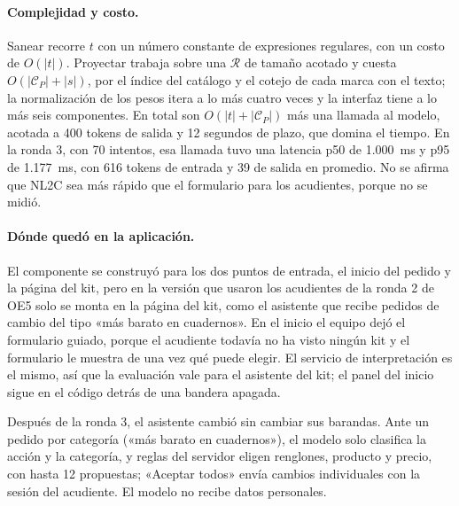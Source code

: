 \paragraph{Complejidad y costo.} Sanear recorre $t$ con un número constante de expresiones
regulares, con un costo de $O(|t|)$. Proyectar trabaja sobre una $\mathcal{R}$ de tamaño acotado y
cuesta $O(|\mathcal{C}_P|+|s|)$, por el índice del catálogo y el cotejo de cada marca con el texto;
la normalización de los pesos itera a lo más cuatro veces y la interfaz tiene a lo más seis
componentes. En total son $O(|t|+|\mathcal{C}_P|)$ más una llamada al modelo, acotada a 400 tokens de
salida y 12 segundos de plazo, que domina el tiempo. En la ronda 3, con 70 intentos, esa llamada tuvo
una latencia p50 de 1.000~ms y p95 de 1.177~ms, con 616 tokens de entrada y 39 de salida en promedio.
No se afirma que NL2C sea más rápido que el formulario para los acudientes, porque no se midió.

\paragraph{Dónde quedó en la aplicación.} El componente se construyó para los dos puntos de
entrada, el inicio del pedido y la página del kit, pero en la versión que usaron los acudientes de
la ronda 2 de OE5 solo se monta en la página del kit, como el asistente que recibe pedidos de cambio
del tipo «más barato en cuadernos». En el inicio el equipo dejó el formulario guiado, porque el
acudiente todavía no ha visto ningún kit y el formulario le muestra de una vez qué puede elegir. El
servicio de interpretación es el mismo, así que la evaluación vale para el asistente del kit; el panel del inicio sigue en el código detrás de una bandera apagada.

Después de la ronda 3, el asistente cambió sin cambiar sus barandas. Ante un pedido por categoría
(«más barato en cuadernos»), el modelo solo clasifica la acción y la categoría, y reglas del
servidor eligen renglones, producto y precio, con hasta 12 propuestas; «Aceptar
todos» envía cambios individuales con la sesión del acudiente. El modelo no recibe datos personales.

